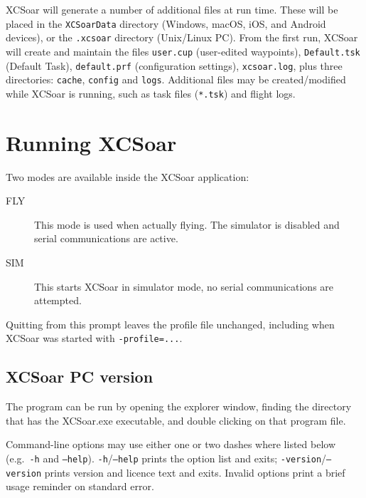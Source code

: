 XCSoar will generate a number of additional files at run time.  These
will be placed in the  \texttt{XCSoarData} directory (Windows, macOS,
iOS, and Android devices), or the \texttt{.xcsoar} directory (Unix/Linux
PC).  From the first run, XCSoar will create and maintain the files
\texttt{user.cup} (user-edited waypoints),
\texttt{Default.tsk} (Default Task),  
\texttt{default.prf} 
(configuration settings),
\texttt{xcsoar.log}, 
plus three directories: \texttt{cache},
\texttt{config} and \texttt{logs}.  Additional files may be
created/modified while XCSoar is running, such as task files
(\texttt{*.tsk}) and flight logs.


\section{Running XCSoar}

Two modes are available inside the XCSoar application: 
\begin{description}
\item[FLY] This mode is used when actually flying.  The simulator is 
  disabled and serial communications are active. 
\item[SIM] This starts XCSoar in simulator mode, no serial communications
  are attempted.
\end{description}
Quitting from this prompt leaves the profile file unchanged, including
when XCSoar was started with \verb|-profile=...|.

\subsection*{XCSoar PC version}
The program can be run by opening the explorer window, finding the directory
that has the XCSoar.exe executable, and double clicking on that program file.

Command-line options may use either one or two dashes where listed below (e.g.\
\texttt{-h} and \texttt{--help}).
\texttt{-h}/\texttt{--help} prints the option list and exits;
\texttt{-version}/\texttt{--version} prints version and licence text and exits.
Invalid options print a brief usage reminder on standard error.

